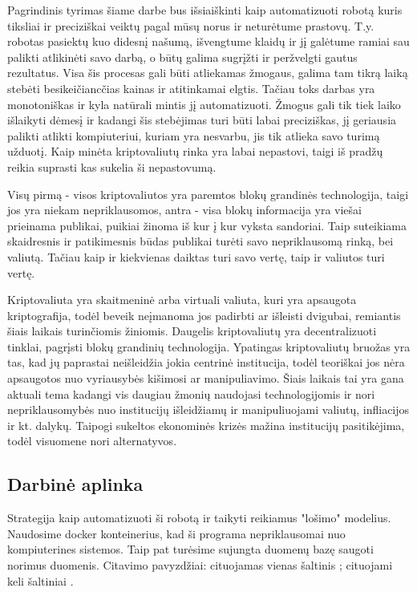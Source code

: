 \documentclass{VUMIFInfKursinis}
\begin{document}
Pagrindinis tyrimas šiame darbe bus išsiaiškinti kaip automatizuoti robotą kuris tiksliai ir preciziškai veiktų pagal mūsų norus ir neturėtume
prastovų. T.y. robotas pasiektų kuo didesnį našumą, išvengtume klaidų ir jį galėtume ramiai sau palikti atlikinėti savo darbą, o būtų galima sugrįžti
ir peržvelgti gautus rezultatus. Visa šis procesas gali būti atliekamas žmogaus, galima tam tikrą laiką stebėti besikeičiancčias kainas ir atitinkamai elgtis.
Tačiau toks darbas yra monotoniškas ir kyla natūrali mintis jį automatizuoti. Žmogus gali tik tiek laiko išlaikyti dėmesį ir kadangi šis stebėjimas turi būti labai preciziškas,
jį geriausia palikti atlikti kompiuteriui, kuriam yra nesvarbu, jis tik atlieka savo turimą užduotį. Kaip minėta kriptovaliutų rinka yra labai nepastovi, taigi iš pradžų
reikia suprasti kas sukelia ši nepastovumą.

Visų pirmą - visos kriptovaliutos yra paremtos blokų grandinės technologija, taigi jos yra
niekam nepriklausomos, antra - visa blokų informacija yra viešai prieinama publikai, puikiai žinoma iš kur į kur vyksta sandoriai.
Taip suteikiama skaidresnis ir patikimesnis būdas publikai turėti savo nepriklausomą rinką, bei valiutą.
Tačiau kaip ir kiekvienas daiktas turi savo vertę, taip ir valiutos turi vertę.

Kriptovaliuta yra skaitmeninė arba virtuali valiuta, kuri yra apsaugota kriptografija, todėl beveik neįmanoma jos padirbti ar išleisti dvigubai, remiantis šiais laikais turinčiomis
žiniomis. Daugelis kriptovaliutų yra decentralizuoti tinklai, pagrįsti blokų grandinių technologija. Ypatingas kriptovaliutų bruožas yra tas, kad jų paprastai neišleidžia
jokia centrinė institucija, todėl teoriškai jos nėra apsaugotos nuo vyriausybės kišimosi ar manipuliavimo. Šiais laikais tai yra gana aktuali tema kadangi vis daugiau žmonių
naudojasi technologijomis ir nori nepriklausomybės nuo institucijų išleidžiamų ir manipuliuojami valiutų, infliacijos ir kt. dalykų. Taipogi sukeltos ekonominės krizės mažina
institucijų pasitikėjima, todėl visuomene nori alternatyvos.

\subsection{Darbinė aplinka}
Strategija kaip automatizuoti ši robotą ir taikyti reikiamus "lošimo" modelius. Naudosime docker konteinerius, kad ši programa nepriklausomai 
nuo kompiuterines sistemos. Taip pat turėsime sujungta duomenų bazę saugoti norimus duomenis. 
Citavimo pavyzdžiai: cituojamas vienas šaltinis \cite{PvzStraipsnLt}; cituojami
keli šaltiniai \cite{PvzStraipsnEn, PvzKonfLt, PvzKonfEn, PvzKnygLt, PvzKnygEn,
  PvzElPubLt, PvzElPubEn, PvzMagistrLt, PvzPhdEn}.
\end{document}
